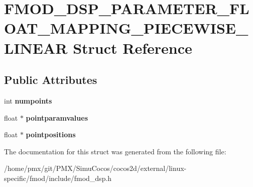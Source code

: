 \hypertarget{structFMOD__DSP__PARAMETER__FLOAT__MAPPING__PIECEWISE__LINEAR}{}\section{F\+M\+O\+D\+\_\+\+D\+S\+P\+\_\+\+P\+A\+R\+A\+M\+E\+T\+E\+R\+\_\+\+F\+L\+O\+A\+T\+\_\+\+M\+A\+P\+P\+I\+N\+G\+\_\+\+P\+I\+E\+C\+E\+W\+I\+S\+E\+\_\+\+L\+I\+N\+E\+AR Struct Reference}
\label{structFMOD__DSP__PARAMETER__FLOAT__MAPPING__PIECEWISE__LINEAR}
\subsection*{Public Attributes}
\begin{DoxyCompactItemize}
\item 
\mbox{\label{structFMOD__DSP__PARAMETER__FLOAT__MAPPING__PIECEWISE__LINEAR_a1ca2a8a0cf65f096383c1afc06ce8f09}} 
int {\bfseries numpoints}
\item 
\mbox{\label{structFMOD__DSP__PARAMETER__FLOAT__MAPPING__PIECEWISE__LINEAR_afa31e9efbd0de2f31321712b0b537681}} 
float $\ast$ {\bfseries pointparamvalues}
\item 
\mbox{\label{structFMOD__DSP__PARAMETER__FLOAT__MAPPING__PIECEWISE__LINEAR_a6cdcfb50fc779f4bf4175d4bd514fc97}} 
float $\ast$ {\bfseries pointpositions}
\end{DoxyCompactItemize}


The documentation for this struct was generated from the following file\+:\begin{DoxyCompactItemize}
\item 
/home/pmx/git/\+P\+M\+X/\+Simu\+Cocos/cocos2d/external/linux-\/specific/fmod/include/fmod\+\_\+dsp.\+h\end{DoxyCompactItemize}
